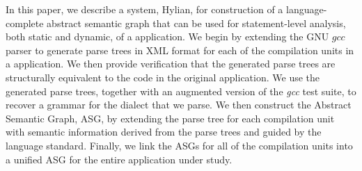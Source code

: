

In this paper, we describe a system, Hylian, for construction
of a language-complete
abstract semantic graph that can be used for statement-level
analysis, both static and dynamic, of a {\CPP} application.
We begin by extending the GNU $gcc$ parser to generate parse 
trees in XML format for each of the compilation units in a {\CPP} 
application.  We then provide verification that the generated parse 
trees are structurally equivalent to the code in the original {\CPP} 
application.
We use the generated parse trees, together with an augmented version of
the {\em gcc} test suite,
to recover a grammar for the {\CPP} dialect that we parse.
We then construct the Abstract Semantic Graph, ASG, by extending the 
parse tree for each compilation unit with semantic 
information derived from the parse trees and guided by the {\CPP} 
language standard.
Finally, we link the ASGs for all of the compilation units into a 
unified ASG for the entire application under study. 
